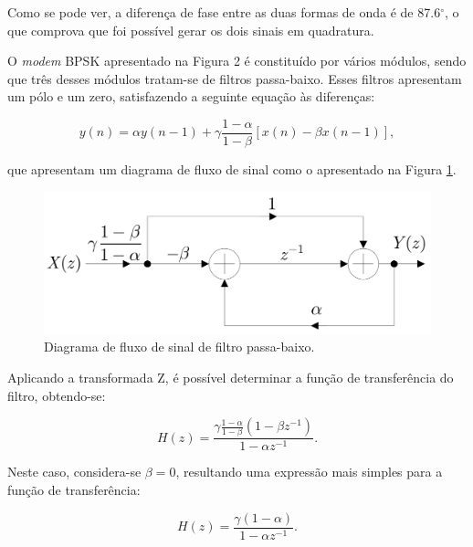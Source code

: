 \documentclass[11pt]{article}
\numberwithin{equation}{section}
\begin{document}
Como se pode ver, a diferença de fase entre as duas formas de onda é de 87.6$^{\circ}$, o que comprova que foi possível gerar os dois sinais em quadratura.

O \textit{modem} BPSK apresentado na Figura 2 é constituído por vários módulos, sendo que três desses módulos tratam-se de filtros passa-baixo. Esses filtros apresentam um pólo e um zero, satisfazendo a seguinte equação às diferenças:

\vspace{-3mm}
\begin{equation}
y(n) = \alpha y(n-1) + \gamma \frac{1-\alpha}{1-\beta}[x(n)-\beta x(n-1)],
\end{equation} 

\vspace{1mm}
que apresentam um diagrama de fluxo de sinal como o apresentado na Figura \ref{fig:fluxo}.

\begin{figure}[H]
	\centering
	\includegraphics[keepaspectratio=true, scale=0.20]{teoricas/diagrama_fluxo}
	\caption{Diagrama de fluxo de sinal de filtro passa-baixo.}
	\label{fig:fluxo}
	\vspace{-0.8em}
\end{figure}

Aplicando a transformada Z, é possível determinar a função de transferência do filtro, obtendo-se:

\vspace{-3mm}
\begin{equation}
H(z) = \frac{\gamma \frac{1-\alpha}{1-\beta} (1-\beta z^{-1})}{1-\alpha z^{-1}}.
\end{equation}
 
\vspace{1mm}
Neste caso, considera-se $\beta=0$, resultando uma expressão mais simples para a função de transferência:
 
\vspace{-3mm}
\begin{equation}
H(z) = \frac{\gamma(1-\alpha)}{1-\alpha z^{-1}}.
\end{equation} 
\end{document}
